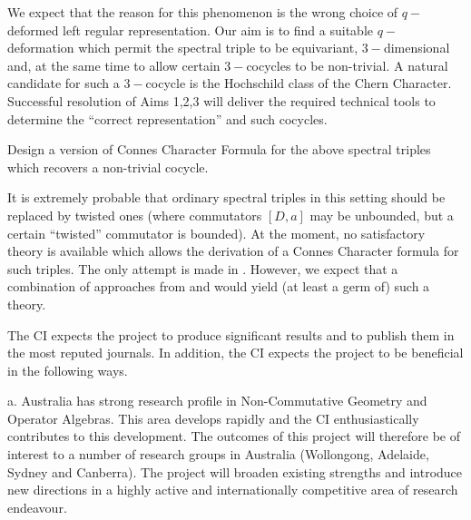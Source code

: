 \documentclass[12pt]{article}
\newcommand{\archeading}[1]{\vspace{.3cm} \noindent{\bfseries #1} \vspace{.1cm}   }
\begin{document}
We expect that the reason for this phenomenon is the wrong choice of $q-$deformed left regular representation. Our aim is to find a suitable $q-$deformation which permit the spectral triple to be equivariant, $3-$dimensional and, at the same time to allow certain $3-$cocycles to be non-trivial. A natural candidate for such a $3-$cocycle is the Hochschild class of the Chern Character. Successful resolution of Aims 1,2,3 will deliver the required technical tools to determine the ``correct representation'' and such cocycles.


 Design a version of Connes Character Formula for the above spectral triples which recovers a non-trivial cocycle.

It is extremely probable that ordinary spectral triples in this setting should be replaced by twisted ones (where commutators $[D,a]$ may be unbounded, but a certain ``twisted'' commutator is bounded). At the moment, no satisfactory theory is available which allows the derivation of a Connes Character formula for such triples. The only attempt is made in \cite{MasF}. However, we expect that a combination of approaches from \cite{MasF} and \cite{CRSZ} would yield (at least a germ of) such a theory.


\bigskip\archeading{Benefit}

The CI expects the project to produce significant results and to publish them in the most reputed journals. In addition, the CI expects the project to be beneficial in the following ways.

a. Australia has strong research profile in Non-Commutative Geometry and Operator Algebras. This area develops rapidly and the CI enthusiastically contributes to this development. The outcomes of this project will therefore be of interest to a number of research groups in Australia (Wollongong, Adelaide, Sydney and Canberra). The project will broaden existing strengths and introduce new directions in a highly active and internationally competitive area of research endeavour. 



\end{document}
